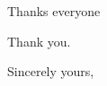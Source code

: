 \begin{acknowledgments}

Thanks everyone

\vspace{1.5cm}
Thank you.
\begin{flushright}

Sincerely yours,\\
\vspace{2cm}
	\SgIntAuthor
\end{flushright} 
\end{acknowledgments}